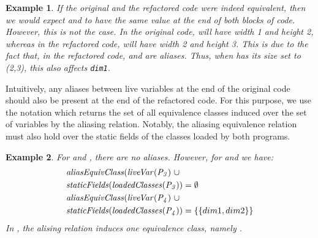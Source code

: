 \documentclass[10pt,conference]{IEEEtran}
\newtheorem{example}{Example}
\begin{document}
\begin{example}
If the original and the refactored code were indeed equivalent,
then we would expect  and  to have the same value at the end of both blocks of code. 
However, this is not the case.
In the original code,  will have width 1 and height 2, whereas in the refactored code,
 will have width 2 and height 3. This is due to the fact that,
in the refactored code,  and  are aliases. %
Thus, when  has its size set to (2,3), this also affects \texttt{dim1}.
\end{example}  

Intuitively, any aliases between live variables at the end of the original code should also
be present at the end of the refactored code. For this purpose, we use the notation
 which returns the set of all equivalence classes induced over the
set of variables  by the aliasing relation.  
Notably, the aliasing equivalence relation must also hold over the
static fields of the classes loaded by both programs.


\begin{example}
For  and , there are no aliases. 
%
However, for  and  we have:
\[
\begin{aligned}[t]
  &\mathit{{aliasEquivClass(liveVar(P_3)}}~ \cup\\
  &\mathit{{staticFields(loadedClasses(P_3))}} = \emptyset\\
  &\mathit{{aliasEquivClass(liveVar(P_4)}} ~\cup\\
  &\mathit{{staticFields(loadedClasses(P_4))}} = \{\{dim1, dim2\}\} 
\end{aligned}
\]
In , the alising relation induces one equivalence class, namely .

\end{example}
  
\end{document}
